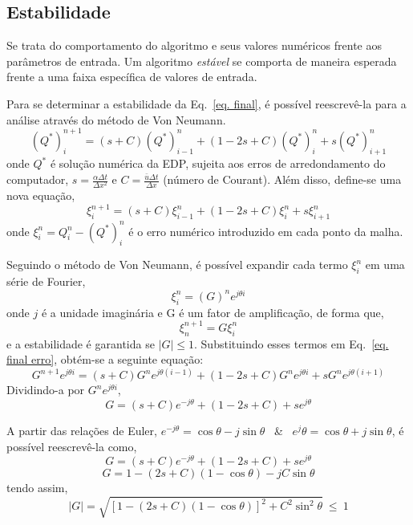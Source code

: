 \subsection{Estabilidade}
Se trata do comportamento do algoritmo e seus valores numéricos frente aos
parâmetros de entrada. Um algoritmo \emph{estável} se comporta de maneira
esperada frente a uma faixa específica de valores de entrada.

Para se determinar a estabilidade da Eq.\ \ref{eq. final}, é possível
reescrevê-la para a análise através do método de Von Neumann.
\begin{equation}
    (Q^*)_i^{n+1} = (s + C)(Q^*)_{i-1}^n + (1 - 2s + C)(Q^*)_i^n +
    s(Q^*)_{i+1}^n
\end{equation}
onde $Q^*$ é solução numérica da EDP, sujeita aos erros de arredondamento do
computador, $s = \frac{\alpha\Delta t}{\Delta x^2}$ e $C = \frac{\bar{u}\Delta
t}{\Delta x}$ (número de Courant). Além disso, define-se uma nova equação,
\begin{equation}\label{eq. final erro}
    \xi_i^{n+1} = (s + C)\xi_{i-1}^n + (1 - 2s + C)\xi_i^n + s\xi_{i+1}^n
\end{equation}
onde $\xi_i^n = Q_i^n - (Q^*)_i^n$ é o erro numérico introduzido em cada ponto
da malha.

Seguindo o método de Von Neumann, é possível expandir cada termo $\xi_i^n$ em
uma série de Fourier,
\begin{equation}
    \xi_i^n = (G)^n e^{j \theta i}
\end{equation}
onde $j$ é a unidade imaginária e G é um fator de amplificação, de forma que,
\begin{equation}
    \xi_n^{n+1} = G\xi_i^n
\end{equation}
e a estabilidade é garantida se $|G| \leq 1$. Substituindo esses termos em Eq.\
\ref{eq. final erro}, obtém-se a seguinte equação:
\begin{equation}
    G^{n+1}e^{j \theta i} =
      (s + C)G^n e^{j \theta (i-1)}
      + (1 - 2s + C)G^n e^{j \theta i}
      + s G^n e^{j \theta (i+1)}
\end{equation}
Dividindo-a por $G^n e^{j \theta i}$,
\[
    G = (s + C)e^{-j \theta} + (1 - 2s + C) + se^{j \theta}
\]

A partir das relações de Euler, $e^{-j \theta} = \cos\theta - j\sin\theta$ \ \&
\ $e^j\theta = \cos\theta + j\sin\theta$, é possível reescrevê-la como,
\[
    G = (s + C)e^{-j \theta} + (1 - 2s + C) + se^{j \theta}
\]
\[
    G = 1 - (2s + C)(1 - \cos\theta) - jC\sin\theta
\]
tendo assim,
\begin{equation}
    |G| = \sqrt{[1 - (2s + C)(1-\cos\theta)]^2 + C^2\sin^2\theta}\ \leq\ 1
\end{equation}

